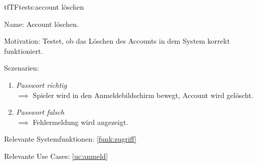 \begin{description}[leftmargin=5em, style=sameline]

\begin{lhp}{tf}{TF}{tests:account löschen}
	\item [Name:] Account löschen.
	\item [Motivation:] Testet, ob das Löschen des Accounts in dem System korrekt funktioniert.
	\item [Sczenarien:] \hfill
		\begin{enumerate}
			\item \textit{Passwort richtig} \\ $\implies$ Spieler wird in den Anmeldebildschirm bewegt, Account wird gelöscht.
			\item \textit{Passwort falsch} \\ $\implies$ Fehlermeldung wird angezeigt.
	
		\end{enumerate}
	\item [Relevante Systemfunktionen:] \ref{funk:zugriff}
	\item [Relevante Use Cases:] \ref{uc:anmeld}
\end{lhp}

\end{description}

